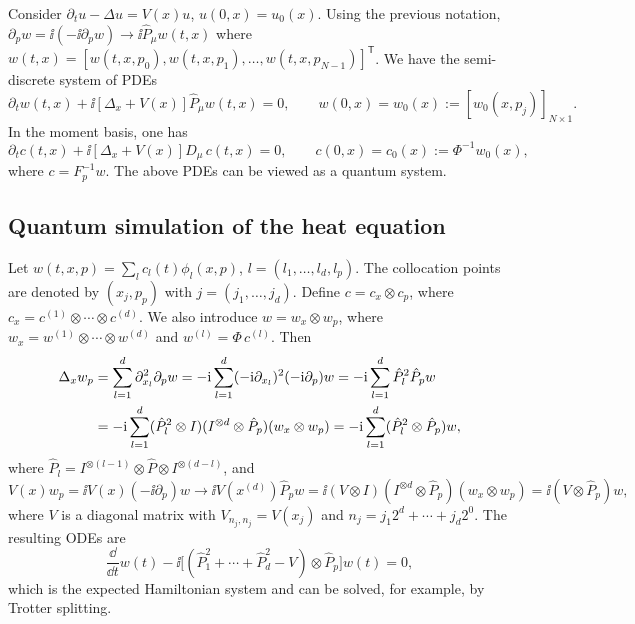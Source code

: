 Consider $\partial_t u - \Delta u = V(x) u$, $u(0, x) = u_0(x)$. Using the
previous notation, $\partial_p w = \ii(-\ii\partial_p w) \to \ii\hat{P}_\mu w(t, x)$
where $w(t, x) = [w(t, x, p_0), w(t, x, p_1), \dots, w(t, x, p_{N-1})]^{\mathsf{T}}$.
We have the semi-discrete system of PDEs
\begin{equation}
  \partial_t w(t, x) + \ii[\Delta_x + V(x)]\hat{P}_\mu w(t, x) = 0,
  \qquad w(0, x) = w_0(x) := [w_0(x, p_j)]_{N \times 1}.
\end{equation}
In the moment basis, one has
\begin{equation}
  \partial_t c(t, x) + \ii[\Delta_x + V(x)] D_\mu\, c(t, x) = 0,
  \qquad c(0, x) = c_0(x) := \Phi^{-1} w_0(x),
\end{equation}
where $c = F_p^{-1} w$. The above PDEs can be viewed as a quantum system.

\subsection{Quantum simulation of the heat equation}\label{sec:sec05-heat-sim}

Let $w(t, x, p) = \sum_l c_l(t)\phi_l(x, p)$, $l = (l_1, \dots, l_d, l_p)$. The
collocation points are denoted by $(x_j, p_p)$ with $j = (j_1, \dots, j_d)$.
Define $c = c_x \otimes c_p$, where $c_x = c^{(1)} \otimes \cdots \otimes c^{(d)}$.
We also introduce $w = w_x \otimes w_p$, where
$w_x = w^{(1)} \otimes \cdots \otimes w^{(d)}$ and $w^{(l)} = \Phi\, c^{(l)}$. Then
\begin{align}
  \Delta_x w_p &= \sum_{l=1}^d \partial_{x_l}^2 \partial_p w
    = -\mathrm{i}\sum_{l=1}^d (-\mathrm{i}\partial_{x_l})^2(-\mathrm{i}\partial_p) w
    = -\mathrm{i}\sum_{l=1}^d \hat{P}_l^2 \hat{P}_p w \notag\\
  &= -\mathrm{i}\sum_{l=1}^d (\hat{P}_l^2 \otimes I)(I^{\otimes d} \otimes \hat{P}_p)(w_x \otimes w_p)
    = -\mathrm{i}\sum_{l=1}^d (\hat{P}_l^2 \otimes \hat{P}_p) w,
\end{align}
where $\hat{P}_l = I^{\otimes(l-1)} \otimes \hat{P} \otimes I^{\otimes(d-l)}$, and
\begin{equation}
  V(x) w_p = \ii V(x)(-\ii\partial_p) w \to \ii V(x^{(d)})\hat{P}_p w
  = \ii(V \otimes I)(I^{\otimes d} \otimes \hat{P}_p)(w_x \otimes w_p) = \ii(V \otimes \hat{P}_p) w,
\end{equation}
where $V$ is a diagonal matrix with $V_{n_j, n_j} = V(x_j)$ and
$n_j = j_1 2^{d} + \cdots + j_d 2^0$. The resulting ODEs are
\begin{equation}
  \frac{\dd}{\dd t} w(t) - \ii\bigl[(\hat{P}_1^2 + \cdots + \hat{P}_d^2 - V) \otimes \hat{P}_p\bigr] w(t) = 0,
\end{equation}
which is the expected Hamiltonian system and can be solved, for example, by
Trotter splitting.

